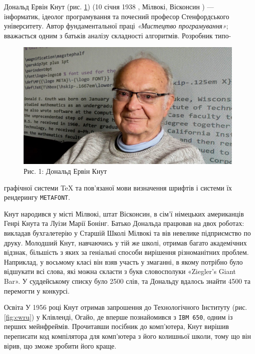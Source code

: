 \documentclass{article}
\begin{document}
Дональд Ервін Кнут (рис. \ref{fig:knuth}) (10 січня 1938 , Мілвокі, Вісконсин ) --- інформатик, ідеолог програмування та почесний професор Стенфордського університету. Автор фундаментальної праці \textit{«Мистецтво програмування»}; вважається одним з батьків аналізу складності алгоритмів. Розробник типо-
\begin{figure}
    \vspace{-15pt}
    \centering
    \includegraphics[width=\linewidth]{Knuth.jpeg}
    \captionsetup{labelformat=empty} 
    \caption{Рис. 1: Дональд Ервін Кнут}
    \label{fig:knuth}
    \vspace{-20pt}
\end{figure}
графічної системи \TeX{} та пов'язаної мови визначення шрифтів і системи їх рендерингу \texttt{METAFONT}.

Кнут народився у місті Мілвокі, штат Вісконсин, в сім'ї німецьких американців Генрі Кнута та Луізи Марії Бонінг. Батько Дональда працював на двох роботах: викладав бухгалетерію у Старшій Школі Мілвокі та вів невелике підприємство по друку. Молодший Кнут, навчаючись у тій же школі, отримав багато академічних відзнак, більшість з яких за геніальні способи вирішення різноманітних проблем. Наприклад, у восьмому класі він взяв участь у змаганні, в якому потрібно було відшукати всі слова, які можна скласти з букв словосполуки «Ziegler's Giant Bar». У суддейському списку було 2500 слів, та Дональду вдалось знайти 4500 та перемогти у конкурсі.

Освіта У 1956 році Кнут отримав запрошення до Технологічного Інституту (рис. \ref{fig:cwru}) у Клівленді, Огайо, де вперше познайомився з \texttt{IBM 650}, одним із перших мейнфреймів. Прочитавши посібник до комп'ютера, Кнут вирішив переписати код компілятора для комп'ютера з його колишньої школи, тому що
він вірив, що зможе зробити його краще.
\end{document}
